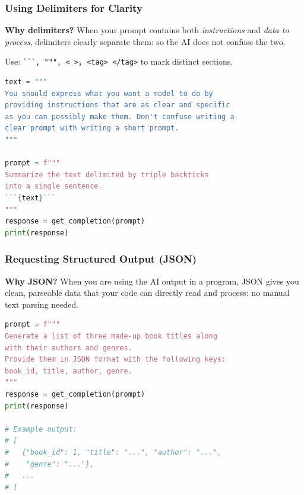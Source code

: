 \begin{frame}[fragile]\frametitle{Using Delimiters for Clarity}

\textbf{Why delimiters?} When your prompt contains both \emph{instructions} and \emph{data to process}, delimiters clearly separate them: so the AI does not confuse the two.

Use: \lstinline|```, """, < >, <tag> </tag>| to mark distinct sections.

\begin{lstlisting}[language=Python]
text = """
You should express what you want a model to do by 
providing instructions that are as clear and specific 
as you can possibly make them. Don't confuse writing a 
clear prompt with writing a short prompt.
"""

prompt = f"""
Summarize the text delimited by triple backticks 
into a single sentence.
```{text}```
"""
response = get_completion(prompt)
print(response)
\end{lstlisting}
		
\end{frame}

\begin{frame}[fragile]\frametitle{Requesting Structured Output (JSON)}

\textbf{Why JSON?} When you are using the AI output in a program, JSON gives you clean, parseable data that your code can directly read and process: no manual text parsing needed.

\begin{lstlisting}[language=Python]
prompt = f"""
Generate a list of three made-up book titles along 
with their authors and genres. 
Provide them in JSON format with the following keys: 
book_id, title, author, genre.
"""
response = get_completion(prompt)
print(response)

# Example output:
# [
#   {"book_id": 1, "title": "...", "author": "...", 
#    "genre": "..."},
#   ...
# ]
\end{lstlisting}
		
\end{frame}


